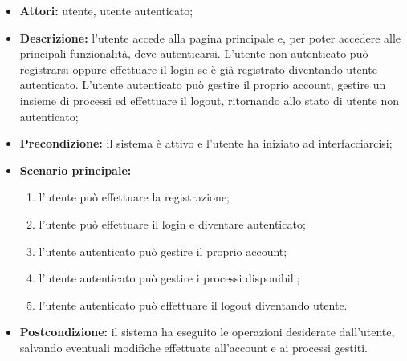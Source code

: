 \begin{itemize}
\item \textbf{Attori:} utente, utente autenticato;
\item \textbf{Descrizione:} l'utente accede alla pagina principale e, per poter accedere alle principali funzionalità, deve autenticarsi.
L'utente non autenticato può registrarsi oppure effettuare il login se è già registrato diventando utente autenticato.
L'utente autenticato può gestire il proprio account, gestire un insieme di processi ed effettuare il logout, ritornando allo stato di utente non autenticato;
\item \textbf{Precondizione:} il sistema è attivo e l'utente ha iniziato ad interfacciarcisi;
\item \textbf{Scenario principale:}
\begin{enumerate}
\item l'utente può effettuare la registrazione;
\item l'utente può effettuare il login e diventare autenticato;
\item l'utente autenticato può gestire il proprio account;
\item l'utente autenticato può gestire i processi disponibili;
\item l'utente autenticato può effettuare il logout diventando utente.
\end{enumerate}
\item \textbf{Postcondizione:} il sistema ha eseguito le operazioni desiderate dall'utente, salvando eventuali modifiche effettuate all'account e ai processi gestiti.
\end{itemize}

